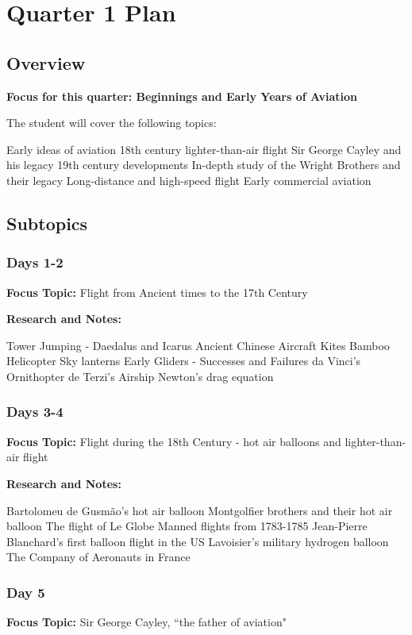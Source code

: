 \documentclass[12pt]{article}
\begin{document}
\section{Quarter 1 Plan}
\subsection{Overview}
\textbf{Focus for this quarter: Beginnings and Early Years of Aviation}

The student will cover the following topics:
\begin{outline}
\1 Early ideas of aviation
\1 18th century lighter-than-air flight
\1 Sir George Cayley and his legacy
\1 19th century developments
\1 In-depth study of the Wright Brothers and their legacy
\1 Long-distance and high-speed flight
\1 Early commercial aviation
\end{outline}

\subsection{Subtopics}
\subsubsection{Days 1-2}
\textbf{Focus Topic:} Flight from Ancient times to the 17th Century

\textbf{Research and Notes:}
\begin{outline}
    \1 Tower Jumping - Daedalus and Icarus
\1 Ancient Chinese Aircraft
\2 Kites
\2 Bamboo Helicopter
\2 Sky lanterns
\1 Early Gliders - Successes and Failures
\1 da Vinci's Ornithopter
\1 de Terzi's Airship
\1 Newton's drag equation
\end{outline}
\subsubsection{Days 3-4}
\textbf{Focus Topic:} Flight during the 18th Century - hot air balloons and lighter-than-air flight

\textbf{Research and Notes:}
\begin{outline}
    \1 Bartolomeu de Gusm\~{a}o's hot air balloon
\1 Montgolfier brothers and their hot air balloon
\1 The flight of Le Globe
\1 Manned flights from 1783-1785
\1 Jean-Pierre Blanchard's first balloon flight in the US
\1 Lavoisier's military hydrogen balloon
\1 The Company of Aeronauts in France
\end{outline}

\subsubsection{Day 5}
\textbf{Focus Topic:} Sir George Cayley, ``the father of aviation"
\end{document}

